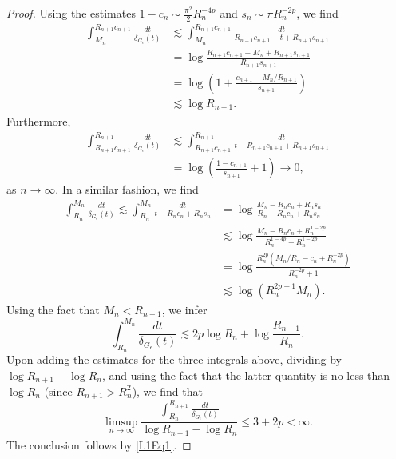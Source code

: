 \documentclass[10pt,a4paper]{amsart}
\begin{document}
\begin{proof}
Using the estimates $1-c_n\sim \frac{\pi^2}{2} R_n^{-4p}$ and $s_n \sim \pi R_n^{-2p}$, we find
\begin{align*}
	\int_{M_n}^{R_{n+1}c_{n+1}}\frac{dt}{\delta_{G_\epsilon}(t)} &\lesssim \int_{M_n}^{R_{n+1}c_{n+1}}\frac{dt}{R_{n+1}c_{n+1}-t+R_{n+1}s_{n+1}}\\
	&=\log\frac{R_{n+1}c_{n+1}-M_n+R_{n+1}s_{n+1}}{R_{n+1}s_{n+1}} \\
	&=\log\left(1+\frac{c_{n+1}-M_n/R_{n+1}}{s_{n+1}}\right) \\
	&\lesssim \log R_{n+1}.
\end{align*}
Furthermore, 
\begin{align*}
\int_{R_{n+1}c_{n+1}}^{R_{n+1}}\frac{dt}{\delta_{G_\epsilon}(t)}&\lesssim 
\int_{R_{n+1}c_{n+1}}^{R_{n+1}}\frac{dt}{t-R_{n+1}c_{n+1}+R_{n+1}s_{n+1}}\\
&=\log\left(\frac{1-c_{n+1}}{s_{n+1}}+1\right)\to 0,
\end{align*}
as $n\to\infty$. In a similar fashion, we find
\begin{align*}
\int_{R_n}^{M_n}\frac{dt}{\delta_{G_\epsilon}(t)}\lesssim \int_{R_n}^{M_n}\frac{dt}{t-R_nc_n+R_ns_n}&=\log\frac{M_n-R_nc_n+R_ns_n}{R_n-R_nc_n+R_ns_n}\\
&\lesssim \log\frac{M_n-R_nc_n+R_n^{1-2p}}{R_n^{1-4p}+R_n^{1-2p}}\\
&=\log \frac{R_n^{2p}\left(M_n/R_n-c_n+R_n^{-2p}\right)}{R_n^{-2p}+1}\\
&\lesssim \log \left(R_n^{2p-1}M_n\right).
\end{align*}
Using the fact that $M_n<R_{n+1}$, we infer
\[
\int_{R_n}^{M_n}\frac{dt}{\delta_{G_\epsilon}(t)}\lesssim 2p\log R_n+\log\frac{R_{n+1}}{R_n}.
\]
Upon adding the estimates for the three integrals above, dividing by $\log R_{n+1}-\log R_n$, and using the fact that the latter quantity is no less than $\log R_n$ (since $R_{n+1}>R_n^2$), we find that 
\[
\limsup_{n\to\infty}\frac{\int_{R_n}^{R_{n+1}}\frac{dt}{\delta_{G_\epsilon}(t)}}{\log R_{n+1}-\log R_n}\leq 3+2p<\infty.
\]                            
The conclusion follows by \eqref{L1Eq1}.
\end{proof}
\end{document}
